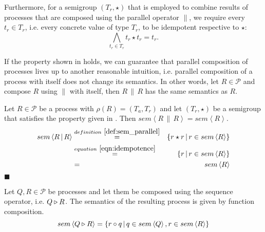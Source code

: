 Furthermore, for a semigroup $\left(T_r, \star \right)$ that is employed to combine results of processes that are composed using the parallel operator $\parallel$, we require every $t_r \in T_r$, i.e. every concrete value of type $T_r$, to be idempotent respective to $\star$:
\begin{equation}
  \label{eqn:idempotence}
  \bigwedge_{t_r \in T_r} t_r \star t_r = t_r.
\end{equation}

\begin{theorem}
If the property shown in  holds, we can guarantee that parallel composition of processes lives up to another reasonable intuition, i.e. parallel composition of a process with itself does not change its semantics. In other words, let $R \in \mathcal{P}$ and compose $R$ using $\parallel$ with itself, then $R \,\parallel\, R$ has the same semantics as $R$.
\end{theorem}

\begin{myproof}
Let $R \in \mathcal{P}$ be a process with $\rho \left( R \right) = \left( T_a, T_r \right)$ and let $\left( T_r, \star \right)$ be a semigroup that satisfies the property given in . Then $sem \left\langle R \,\parallel\, R \right\rangle = sem \left\langle R \right\rangle$.
  \begin{eqnarray*}
    sem \left\langle R \,\parallel\, R \right\rangle & \overset{\defref{def:sem_parallel}}{=} & \left\{ r \star r \,|\, r \in sem \left\langle R \right\rangle \right\} \\
    & \overset{\eqnref{eqn:idempotence}}{=} & \left\{ r \,|\, r \in sem \left\langle R \right\rangle \right\} \\
    & = & sem \left\langle R \right\rangle 
  \end{eqnarray*}
  \hfill$\blacksquare$
\end{myproof}



\begin{definition}
\label{def:sem_sequence}
Let $Q, R \in \mathcal{P}$ be processes and let them be composed using the sequence operator, i.e. $Q \triangleright R$. The semantics of the resulting process is given by function composition.
  \begin{equation}
    \label{eqn:sem_sequence}
    sem \left\langle Q \triangleright R \right\rangle = \left\{ r \circ q \,|\, q \in sem \left\langle Q \right\rangle, r \in sem \left\langle R \right\rangle \right\}
  \end{equation}
  \hfill\qedsymbol
\end{definition}

